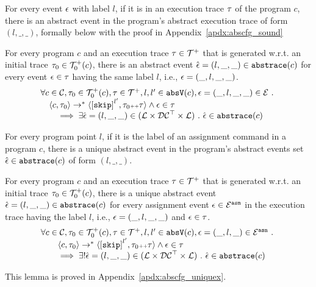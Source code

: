 For every event $\mathtt{\epsilon}$ with label $l$, if it is in an execution trace $\mathtt{\tau}$ of the program $c$, 
 there is an abstract event in the program's abstract execution trace of form $(l, \_, \_)$, formally below
 with the proof in Appendix~\ref{apdx:abscfg_sound}
 \begin{lem}
 \label{lem:abscfg_sound}
 For every program $c$ and
 an execution trace $\mathtt{\tau} \in \mathcal{T}^{+}$ that is generated w.r.t.
 an initial trace $\mathtt{\tau}_0 \in \mathcal{T}^{+}_0(c)$,
 there is an abstract event $\hat{\mathtt{\epsilon}{}} = (l, \_, \_) \in \mathtt{abs}{\mathtt{trace}}(c)$ 
 for every event $\mathtt{\epsilon} \in \mathtt{\tau}$ having the same label $l$, i.e., $\mathtt{\epsilon} = (\_, l, \_, \_)$.
 \[
 \begin{array}{l}
 \forall c \in \cdom, \vtrace_0 \in \ftdom_0(c), \trace \in \ftdom , l, l' \in \absV(c), \event = (\_, l, \_, \_) \in \eventset \sthat
 \\
 \quad
 \config{{c}, \trace_0} \to^{*} \config{\clabel{\eskip}^{l'}, \trace_0 \tracecat \vtrace} 
 \land \event \in \trace 
 \\
 \qquad \implies \exists \absevent = (l, \_, \_) \in (\ldom\times \dcdom^{\top} \times \ldom) \sthat 
 \absevent \in \absflow(c)
 \end{array}
 \]
 \end{lem}

For every program point $l$, if it is the label of an assignment command in a program $c$,
there is a unique abstract event in the program's abstract events set $\hat{\mathtt{\epsilon}{}} \in \mathtt{abs}{\mathtt{trace}}(c)$ of form $(l, \_, \_)$. 
\begin{lem}
 \label{lem:abscfg_uniquex}
 For every program $c$ and
 an execution trace $\mathtt{\tau} \in \mathcal{T}^{+}$ that is generated w.r.t.
 an initial trace $\mathtt{\tau}_0 \in \mathcal{T}^{+}_0(c)$,
 there is a unique abstract event $\hat{\mathtt{\epsilon}{}} = (l, \_, \_) \in \mathtt{abs}{\mathtt{trace}}(c)$ 
 for every assignment event $\mathtt{\epsilon} \in \mathcal{E}^{\mathtt{{asn}}}$ in the
 execution trace having the label $l$, i.e., $\mathtt{\epsilon} = (\_, l, \_, \_)$ and $\mathtt{\epsilon} \in \mathtt{\tau}$.
%
\[
 \begin{array}{l}
 \forall c \in \cdom, \vtrace_0 \in \ftdom_0(c), \trace \in \ftdom , l, l' \in \absV(c), \event = (\_, l, \_) \in \eventset^{\asn} \sthat
 \\
 \qquad \config{{c}, \trace_0} \to^{*} \config{\clabel{\eskip}^{l'}, \trace_0 \tracecat \vtrace} 
 \land \event \in \trace 
 \\
 \qquad \implies \exists! \absevent = (l, \_, \_) \in (\ldom\times \dcdom^{\top} \times \ldom) \sthat 
 \absevent \in \absflow(c)
\end{array}
\]
\end{lem}
This lemma is proved in Appendix~\ref{apdx:abscfg_uniquex}.

